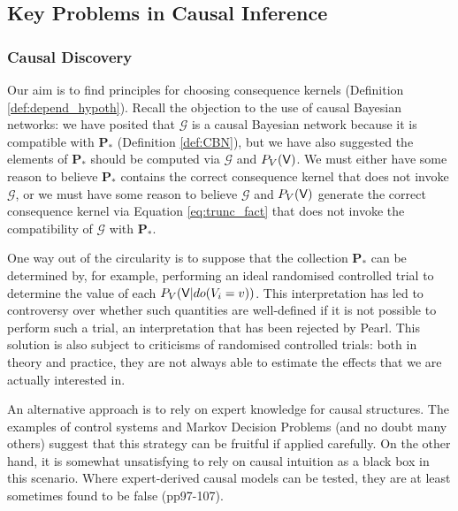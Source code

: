 
\subsection{Key Problems in Causal Inference}

\subsubsection{Causal Discovery}\label{sec:discovery}

Our aim is to find principles for choosing consequence kernels (Definition \ref{def:depend_hypoth}). Recall the objection to the use of causal Bayesian networks: we have posited that $\mathcal{G}$ is a causal Bayesian network because it is compatible with $\mathbf{P}_*$ (Definition \ref{def:CBN}), but we have also suggested the elements of $\mathbf{P}_*$ should be computed via $\mathcal{G}$ and $P_V(\mathsf{V})$. We must either have some reason to believe $\mathbf{P}_*$ contains the correct consequence kernel that does not invoke $\mathcal{G}$, or we must have some reason to believe $\mathcal{G}$ and $P_V(\mathsf{V})$ generate the correct consequence kernel via Equation \ref{eq:trunc_fact} that does not invoke the compatibility of $\mathcal{G}$ with $\mathbf{P}_*$.

One way out of the circularity is to suppose that the collection $\mathbf{P}_*$ can be determined by, for example, performing an ideal randomised controlled trial to determine the value of each $P_V(\mathsf{V}|do(V_i=v))$. This interpretation has led to controversy over whether such quantities are well-defined if it is not possible to perform such a trial, an interpretation that has been rejected by Pearl\cite{hernan_causal_2018,pearl_does_2018,cartwright_causation:_2004}. This solution is also subject to criticisms of randomised controlled trials: both in theory and practice, they are not always able to estimate the effects that we are actually interested in\cite{cartwright_what_2009,teira_causality_2013,heckman_randomization_1991}.

An alternative approach is to rely on expert knowledge for causal structures. The examples of control systems and Markov Decision Problems (and no doubt many others) suggest that this strategy can be fruitful if applied carefully. On the other hand, it is somewhat unsatisfying to rely on causal intuition as a black box in this scenario. Where expert-derived causal models can be tested, they are at least sometimes found to be false \cite{spirtes_causation_1993} (pp97-107). 

